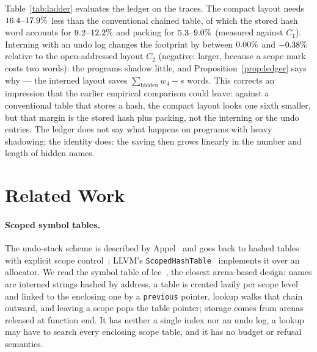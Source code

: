 \documentclass[11pt,a4paper]{article}
\theoremstyle{definition}
\theoremstyle{remark}
\newcommand{\code}[1]{\texttt{#1}}
\begin{document}
\begin{table}[t]
\centering\small
\caption{Smallest fixed buffer (KiB) for the five layouts on the eight compiler traces of the repository, and the savings (percent): of dropping the stored hash ($C_0\to C_1$), of packing ($C_1\to S$), and in total ($C_0\to S$). The accounting reproduces all $24$ minimum buffers measured for $C_0$, $S_{\mathrm{raw}}$ and $S$ exactly (to the $64$-byte resolution of the measurement).}\label{tab:ladder}

\end{table}

Table~\ref{tab:ladder} evaluates the ledger on the traces. The compact layout needs $16.4$--$17.9\%$ less than the conventional chained table, of which the stored hash word accounts for $9.2$--$12.2\%$ and packing for $5.3$--$9.0\%$ (measured against $C_1$). Interning with an undo log changes the footprint by between $0.00\%$ and $-0.38\%$ relative to the open-addressed layout $C_2$ (negative: larger, because a scope mark costs two words): the programs shadow little, and Proposition~\ref{prop:ledger} says why --- the interned layout saves $\sum_{\text{hidden}}w_4-s$ words. This corrects an impression that the earlier empirical comparison could leave: against a conventional table that stores a hash, the compact layout looks one sixth smaller, but that margin is the stored hash plus packing, not the interning or the undo entries. The ledger does not say what happens on programs with heavy shadowing; the identity does: the saving then grows linearly in the number and length of hidden names.

\section{Related Work}\label{sec:related}

\paragraph{Scoped symbol tables.} The undo-stack scheme is described by Appel~\cite{appel1998} and goes back to hashed tables with explicit scope control~\cite{graham1979}; LLVM's \code{ScopedHashTable}~\cite{llvmsht} implements it over an allocator. We read the symbol table of lcc~\cite{fraserhanson1995,lccsym}, the closest arena-based design: names are interned strings hashed by address, a table is created lazily per scope level and linked to the enclosing one by a \code{previous} pointer, lookup walks that chain outward, and leaving a scope pops the table pointer; storage comes from arenas~\cite{hanson1990} released at function end. It has neither a single index nor an undo log, a lookup may have to search every enclosing scope table, and it has no budget or refusal semantics.
\end{document}
